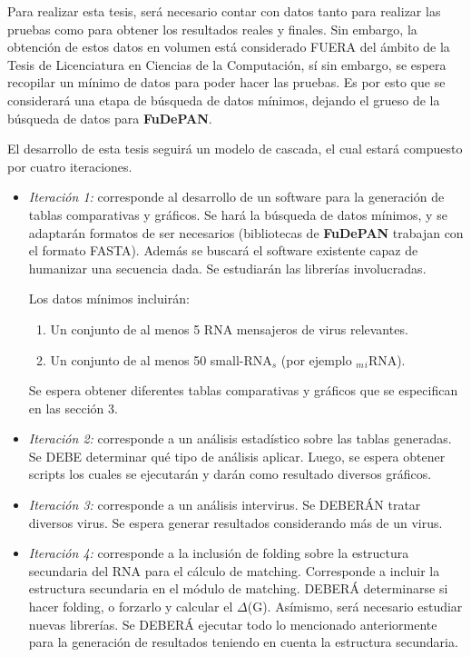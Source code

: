 \documentclass[12pt,a4paper,spanish]{article}
\begin{document}
	\par Para realizar esta tesis, será necesario contar con datos tanto para realizar las pruebas como para obtener los resultados reales y finales.
	Sin embargo, la obtención de estos datos en volumen está considerado FUERA del ámbito de la Tesis de Licenciatura en Ciencias de la Computación, sí 	sin embargo, se espera recopilar un mínimo de datos para poder hacer las pruebas. Es por esto que se considerará una etapa de búsqueda de
	datos mínimos, dejando el grueso de la búsqueda de datos para \textbf{FuDePAN}. 
	\par El desarrollo de esta tesis seguirá un modelo de cascada, el cual estará compuesto por cuatro iteraciones. 
	\begin{itemize}
		\item \textit{Iteración 1:} corresponde al desarrollo de un software para la generación de tablas comparativas y gráficos. Se hará la búsqueda de 										datos mínimos, y se adaptarán formatos de ser necesarios (bibliotecas de \textbf{FuDePAN} trabajan con el formato 										FASTA). Además se buscará el software existente capaz de humanizar una secuencia dada. Se estudiarán las librerías 										involucradas.
									\par Los datos mínimos incluirán:
									\begin{enumerate}
										\item Un conjunto de al menos 5 RNA mensajeros de virus relevantes.
										\item Un conjunto de al menos 50 small-RNA$_s$ (por ejemplo $_m$$_i$RNA).
									\end{enumerate}
									\par Se espera obtener diferentes tablas comparativas y gráficos que se especifican en las sección 3. 

		\item \textit{Iteración 2:} corresponde a un análisis estadístico sobre las tablas generadas. Se DEBE determinar qué tipo de análisis aplicar. 										Luego, se espera obtener scripts los cuales se ejecutarán y darán como resultado diversos gráficos.

		\item \textit{Iteración 3:} corresponde a un análisis intervirus. Se DEBERÁN tratar diversos virus. Se espera generar resultados considerando más 										de un virus. 

		\item \textit{Iteración 4:} corresponde a la inclusión de folding sobre la estructura secundaria del RNA para el cálculo de matching. Corresponde 										a incluir la estructura secundaria en el módulo de matching. DEBERÁ determinarse si hacer folding, o 										forzarlo y calcular el $\Delta$(G). Asímismo, será necesario estudiar nuevas librerías. 
									Se DEBERÁ ejecutar todo lo mencionado anteriormente para la generación de resultados teniendo en cuenta la  									estructura secundaria.
	\end{itemize}
\end{document}
